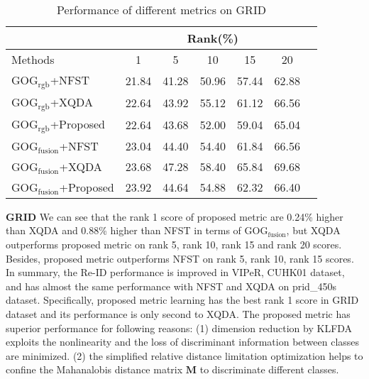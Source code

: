\documentclass[conference,compsoc]{IEEEtran}
\begin{document}
\begin{table}[H]
\caption{Performance of different metrics on GRID}
\centering
\begin{tabular}{|l|c|c|c|c|c|c|}
\hline
& \multicolumn{5}{|c|}{Rank(\%)} \\
\hline
Methods& 1 & 5 &10& 15&20\\
\hline
GOG$_\text{rgb}$+NFST& 21.84&41.28 &50.96& 57.44&62.88 \\ 
\hline
GOG$_\text{rgb}$+XQDA& 22.64&43.92 &55.12 &61.12&66.56\\ 
\hline
GOG$_\text{rgb}$+Proposed&22.64&43.68&52.00&59.04&65.04\\  %
\hline
GOG$_\text{fusion}$+NFST& 23.04&44.40 &54.40 &61.84&66.56\\ 
\hline
GOG$_\text{fusion}$+XQDA& 23.68&47.28 &58.40 &65.84&69.68 \\ 
\hline
GOG$_\text{fusion}$+Proposed&23.92&44.64&54.88&62.32&66.40\\ %

\hline

\end{tabular}
\end{table}
\textbf{GRID} We can see that the rank 1 score of proposed metric are 0.24\% higher than XQDA and 0.88\% higher than NFST in terms of GOG$_\text{fusion}$, but XQDA outperforms proposed metric on rank 5, rank 10, rank 15 and rank 20 scores. Besides, proposed metric outperforms NFST on rank 5, rank 10, rank 15 scores.\\
\indent In summary, the Re-ID performance is improved in VIPeR, CUHK01 dataset, and has almost the same performance with NFST and XQDA on prid\_450s dataset. Specifically, proposed metric learning has the best rank 1 score in GRID dataset and its performance is only second to XQDA. The proposed metric has superior performance for following reasons: (1) dimension reduction by KLFDA exploits the nonlinearity and the loss of discriminant information between classes are minimized. (2) the simplified relative distance limitation optimization helps to confine the Mahanalobis distance matrix $\bm{M}$ to discriminate different classes.  
\end{document}
